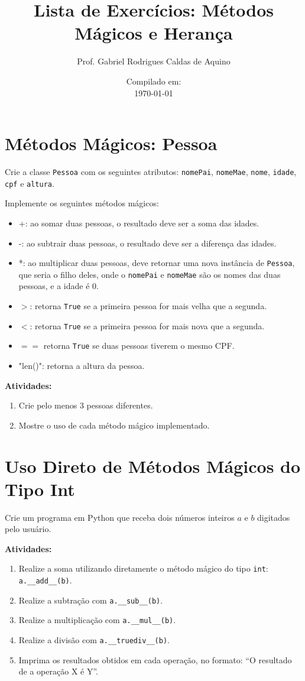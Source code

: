 \documentclass{article}
\title{Lista de Exercícios: Métodos Mágicos e Herança}
\author{Prof. Gabriel Rodrigues Caldas de Aquino}
\date{Compilado em: \\ \today}
\begin{document}
\maketitle


\section{Métodos Mágicos: Pessoa}
Crie a classe \texttt{Pessoa} com os seguintes atributos: \texttt{nomePai}, \texttt{nomeMae}, \texttt{nome}, \texttt{idade}, \texttt{cpf} e \texttt{altura}.

Implemente os seguintes métodos mágicos:

\begin{itemize}
    \item +: ao somar duas pessoas, o resultado deve ser a soma das idades.
    \item -: ao subtrair duas pessoas, o resultado deve ser a diferença das idades.
    \item *: ao multiplicar duas pessoas, deve retornar uma nova instância de \texttt{Pessoa}, que seria o filho deles, onde o \texttt{nomePai} e \texttt{nomeMae} são os nomes das duas pessoas, e a idade é 0.
    \item $>$: retorna \texttt{True} se a primeira pessoa for mais velha que a segunda.
    \item $<$: retorna \texttt{True} se a primeira pessoa for mais nova que a segunda.
    \item $==$ retorna \texttt{True} se duas pessoas tiverem o mesmo CPF.
    \item "len()": retorna a altura da pessoa.
\end{itemize}

\textbf{Atividades:}
\begin{enumerate}
    \item Crie pelo menos 3 pessoas diferentes.
    \item Mostre o uso de cada método mágico implementado.
\end{enumerate}


\section{Uso Direto de Métodos Mágicos do Tipo Int}

Crie um programa em Python que receba dois números inteiros $a$ e $b$ digitados pelo usuário.  

\textbf{Atividades:}
\begin{enumerate}
    \item Realize a soma utilizando diretamente o método mágico do tipo \texttt{int}: \texttt{a.\_\_add\_\_(b)}.
    \item Realize a subtração com \texttt{a.\_\_sub\_\_(b)}.
    \item Realize a multiplicação com \texttt{a.\_\_mul\_\_(b)}.
    \item Realize a divisão com \texttt{a.\_\_truediv\_\_(b)}.
    \item Imprima os resultados obtidos em cada operação, no formato:  
    “O resultado de a operação X é Y”.
\end{enumerate}
\end{document}

